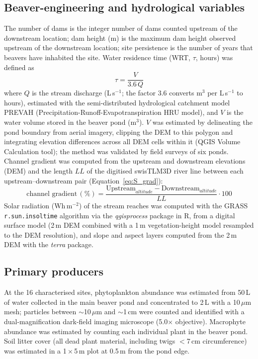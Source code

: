 \documentclass[11pt,a4paper]{article}
\begin{document}
\subsection{Beaver-engineering and hydrological variables}
The number of dams is the integer number of dams counted upstream of the downstream location; dam height (m) is the maximum dam height observed upstream of the downstream location; site persistence is the number of years that beavers have inhabited the site. Water residence time (WRT, $\tau$, hours) was defined as
\begin{equation}
\tau = \frac{V}{3.6\,Q}
\label{eq:S_wrt}
\end{equation}
where $Q$ is the stream discharge (L\,s$^{-1}$; the factor 3.6 converts m$^3$ per L\,s$^{-1}$ to hours), estimated with the semi-distributed hydrological catchment model PREVAH (Precipitation-Runoff-Evapotranspiration HRU model), and $V$ is the water volume stored in the beaver pond (m$^3$). $V$ was estimated by delineating the pond boundary from aerial imagery, clipping the DEM to this polygon and integrating elevation differences across all DEM cells within it (QGIS Volume Calculation tool); the method was validated by field surveys of six ponds. Channel gradient was computed from the upstream and downstream elevations (DEM) and the length $LL$ of the digitised swisTLM3D river line between each upstream--downstream pair (Equation~\ref{eq:S_grad}):
\begin{equation}
\text{channel gradient}\,(\%) = \frac{\text{Upstream}_{altitude} - \text{Downstream}_{altitude}}{LL} \cdot 100
\label{eq:S_grad}
\end{equation}
Solar radiation (Wh\,m$^{-2}$) of the stream reaches was computed with the GRASS \texttt{r.sun.insoltime} algorithm via the \emph{qgisprocess} package in R, from a digital surface model (2\,m DEM combined with a 1\,m vegetation-height model resampled to the DEM resolution), and slope and aspect layers computed from the 2\,m DEM with the \emph{terra} package.

\subsection{Primary producers}
At the 16 characterised sites, phytoplankton abundance was estimated from 50\,L of water collected in the main beaver pond and concentrated to 2\,L with a 10\,$\mu$m mesh; particles between $\sim$10\,$\mu$m and $\sim$1\,cm were counted and identified with a dual-magnification dark-field imaging microscope (5.0$\times$ objective). Macrophyte abundance was estimated by counting each individual plant in the beaver pond. Soil litter cover (all dead plant material, including twigs $<$7\,cm circumference) was estimated in a 1\,$\times$\,5\,m plot at 0.5\,m from the pond edge.
\end{document}
